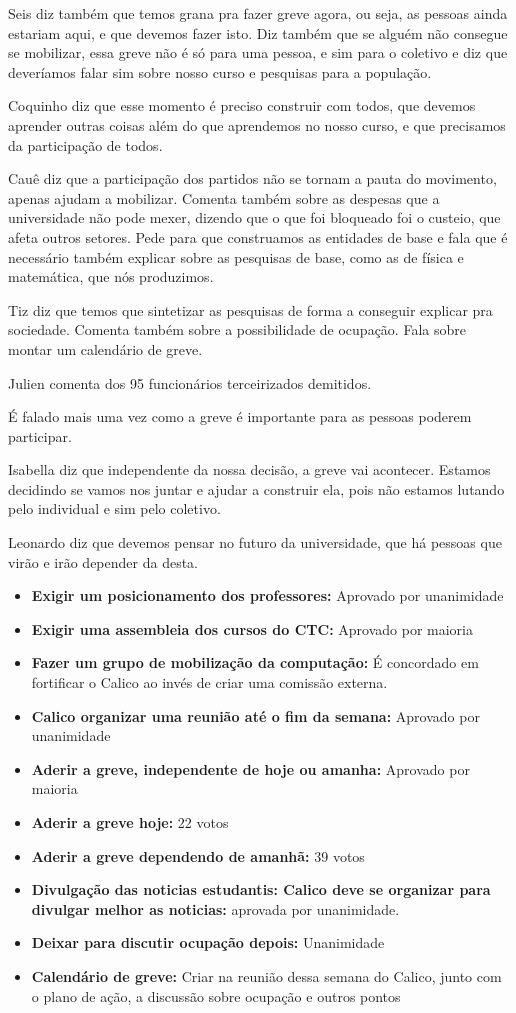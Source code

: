 \documentclass{ata-calico}
\begin{document}
Seis diz também que temos grana pra fazer greve agora, ou seja, as pessoas ainda estariam aqui, e que devemos fazer isto. Diz também que se alguém não consegue se mobilizar, essa greve não é só para uma pessoa, e sim para o coletivo e diz que deveríamos falar sim sobre nosso curso e pesquisas para a população. 

Coquinho diz que esse momento é preciso construir com todos, que devemos aprender outras coisas além do que aprendemos no nosso curso, e que precisamos da participação de todos.

Cauê diz que a participação dos partidos não se tornam a pauta do movimento, apenas ajudam a mobilizar. Comenta também sobre as despesas que a universidade não pode mexer, dizendo que o que foi bloqueado foi o custeio, que afeta outros setores. Pede para que construamos as entidades de base e fala que é necessário também explicar sobre as pesquisas de base, como as de física e matemática, que nós produzimos.

Tiz diz que temos que sintetizar as pesquisas de forma a conseguir explicar pra sociedade. Comenta também sobre a possibilidade de ocupação. Fala sobre montar um calendário de greve. 

Julien comenta dos 95 funcionários terceirizados demitidos.

É falado mais uma vez como a greve é importante para as pessoas poderem participar. 

Isabella diz que independente da nossa decisão, a greve vai acontecer. Estamos decidindo se vamos nos juntar e ajudar a construir ela, pois não estamos lutando pelo individual e sim pelo coletivo. 

Leonardo diz que devemos pensar no futuro da universidade, que há pessoas que virão e irão depender da desta. 
\begin{itemize}
\item \textbf{Exigir um posicionamento dos professores:} Aprovado por unanimidade
\item \textbf{Exigir uma assembleia dos cursos do CTC:} Aprovado por maioria
\item \textbf{Fazer um grupo de mobilização da computação:} É concordado em fortificar o Calico ao invés de criar uma comissão externa.
\item \textbf{Calico organizar uma reunião até o fim da semana:} Aprovado por unanimidade
\item \textbf{Aderir a greve, independente de hoje ou amanha:} Aprovado por maioria
\item \textbf{Aderir a greve hoje:} 22 votos
\item \textbf{Aderir a greve dependendo de amanhã:} 39 votos 
\item \textbf{Divulgação das noticias estudantis: Calico deve se organizar para divulgar melhor as noticias:} aprovada por unanimidade.
\item \textbf{Deixar para discutir ocupação depois:} Unanimidade
\item \textbf{Calendário de greve:} Criar na reunião dessa semana do Calico, junto com o plano de ação, a discussão sobre ocupação e outros pontos
\end{itemize}

\end{document}

